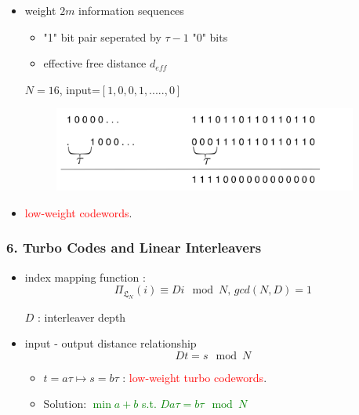 \documentclass{beamer}  %
\begin{document}
\begin{frame}
\begin{itemize}
 
\setlength\itemsep{2em}

\frametitle{5. RSC Encoders and $\tau$-seperated weight 2m errors}

\item weight $2m$ information sequences 
\begin{itemize}
\item "1" bit pair seperated by $\tau -1$ "0" bits
\item effective free distance $d_{eff}$
\end{itemize}


\begin{example}
\centering
 $N=16$, input=$[1, 0, 0, 1,.....,0]$
\begin{figure}
		\includegraphics[width=10cm]{RSCExample.pdf}
		
	\end{figure}
\end{example}
\item  \textcolor{red}{low-weight  codewords}.


\end{itemize}

\end{frame}


\begin{frame}
\frametitle{6.  Turbo Codes and Linear Interleavers }
\begin{itemize}
\item  index mapping function :
\begin{equation}
 \Pi_{\mathfrak{L}_N}(i) \equiv Di \mod N , \, gcd(N,D)=1
\end{equation}
\begin{centering}
 $D$ : interleaver depth
\end{centering}

\item input - output distance relationship
 \begin{equation} 
 Dt =s \mod N
 \label{cong}
 \end{equation}
\begin{itemize}
\item 
$t=a\tau
\mapsto s=b\tau$ :
 \textcolor{red}{low-weight turbo codewords}.

\item Solution: \textcolor{green}{$\min{ a+b}$ s.t. $Da\tau =b\tau \mod N$} 
\end{itemize}
\end{itemize}
\end{frame}
\end{document}
